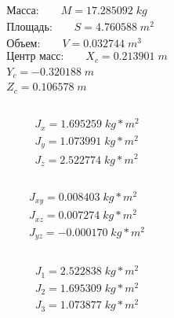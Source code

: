 \begin{eqnarray*}
\text{Масса:} \qquad                             M = 17.285092\; kg \\
\text{Площадь:}    \qquad                        S = 4.760588\; m^2 \\
\text{Объем:}   \qquad                           V = 0.032744\; m^3 \\
\text{Центр масс:}  \qquad                      X_c = 0.213901\; m \\
                                  Y_c = -0.320188\; m \\
                                  Z_c = 0.106578\; m \\
\end{eqnarray*}
 \\
\begin{eqnarray*}
J_x = 1.695259\; kg*m^2 \\
J_y = 1.073991\; kg*m^2 \\
J_z = 2.522774\; kg*m^2 \\
\end{eqnarray*}
     \\
\begin{eqnarray*}
J_{xy} = 0.008403\; kg*m^2 \\
J_{xz} = 0.007274\; kg*m^2 \\
J_{yz} = -0.000170\; kg*m^2 \\
\end{eqnarray*}
 \\
\begin{eqnarray*}
J_1 = 2.522838\; kg*m^2 \\
J_2 = 1.695309\; kg*m^2 \\
J_3 = 1.073877\; kg*m^2 \\
\end{eqnarray*}
